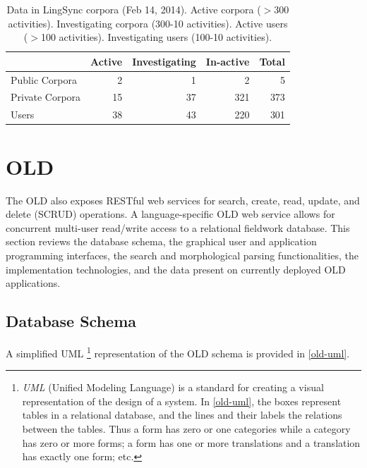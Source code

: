 \documentclass[11pt]{article}
\begin{document}
\begin{table}[h]
\begin{center}
\scriptsize
\begin{tabular}{lrrrr}
      \toprule
                     ~ &  Active & Investigating & In-active & Total\\
      \midrule
      Public Corpora  &       2 &   1 &   2 & 5 \\ 
      Private Corpora &      15 &  37 & 321 & 373\\ 
      Users           &      38 &  43 & 220 & 301 \\
      \bottomrule

\end{tabular}
\caption{Data in LingSync corpora (Feb 14, 2014).
Active corpora ($>$300 activities). Investigating corpora (300-10 activities). Active users ($>$100 activities). Investigating users (100-10 activities).}
\label{lingsync-data}
 \end{center}
 \normalsize
\end{table}


\section{OLD}\label{sec:old}

The OLD also exposes RESTful web services for search, create, read, update, and delete
(SCRUD) operations. A language-specific OLD web service allows for concurrent
multi-user read/write access to a relational fieldwork database. This section
 reviews the database schema, the graphical user and
application programming interfaces, the search and morphological parsing
functionalities, the implementation technologies, and the data present on
currently deployed OLD applications.


\subsection{Database Schema}

A simplified UML%
\footnote{\textit{UML} (Unified Modeling Language) is a standard for creating
    a visual representation of the design of a system. In \autoref{old-uml}, the
    boxes represent tables in a relational database, and the lines and their
    labels the relations between the tables. Thus a form has zero or one
    categories while a category has zero or more forms; a form has one or more
translations and a translation has exactly one form; etc.} %
representation of the OLD schema is provided in
\autoref{old-uml}. 
\end{document}
